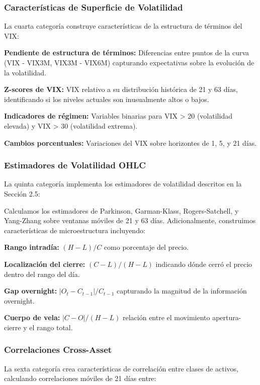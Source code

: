 \documentclass[11pt,a4paper]{article}
\begin{document}
\subsubsection{Características de Superficie de Volatilidad}

La cuarta categoría construye características de la estructura de términos del VIX:

\textbf{Pendiente de estructura de términos:} Diferencias entre puntos de la curva (VIX - VIX3M, VIX3M - VIX6M) capturando expectativas sobre la evolución de la volatilidad.

\textbf{Z-scores de VIX:} VIX relativo a su distribución histórica de 21 y 63 días, identificando si los niveles actuales son inusualmente altos o bajos.

\textbf{Indicadores de régimen:} Variables binarias para VIX > 20 (volatilidad elevada) y VIX > 30 (volatilidad extrema).

\textbf{Cambios porcentuales:} Variaciones del VIX sobre horizontes de 1, 5, y 21 días.

\subsubsection{Estimadores de Volatilidad OHLC}

La quinta categoría implementa los estimadores de volatilidad descritos en la Sección 2.5:

Calculamos los estimadores de Parkinson, Garman-Klass, Rogers-Satchell, y Yang-Zhang sobre ventanas móviles de 21 y 63 días. Adicionalmente, construimos características de microestructura incluyendo:

\textbf{Rango intradía:} $(H - L) / C$ como porcentaje del precio.

\textbf{Localización del cierre:} $(C - L) / (H - L)$ indicando dónde cerró el precio dentro del rango del día.

\textbf{Gap overnight:} $|O_t - C_{t-1}| / C_{t-1}$ capturando la magnitud de la información overnight.

\textbf{Cuerpo de vela:} $|C - O| / (H - L)$ relación entre el movimiento apertura-cierre y el rango total.

\subsubsection{Correlaciones Cross-Asset}

La sexta categoría crea características de correlación entre clases de activos, calculando correlaciones móviles de 21 días entre:
\end{document}
